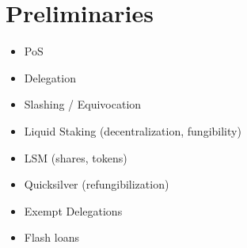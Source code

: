 \section{Preliminaries}

\begin{itemize}
  \item PoS
  \item Delegation
  \item Slashing / Equivocation
  \item Liquid Staking (decentralization, fungibility)
  \item LSM (shares, tokens)
  \item Quicksilver (refungibilization)
  \item Exempt Delegations
  \item Flash loans
\end{itemize}
